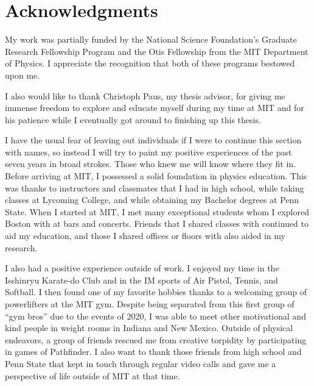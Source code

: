 % 

\cleardoublepage

\section*{Acknowledgments}

My work was partially funded by the National Science Foundation's
Graduate Research Fellowship Program and
the Otis Fellowship from the MIT Department of Physics.
I appreciate the recognition that both of these programs bestowed upon me.

I also would like to thank Christoph Paus, my thesis advisor,
for giving me immense freedom to explore and educate myself during my time at MIT and
for his patience while I eventually got around to finishing up this thesis.

I have the usual fear of leaving out individuals if I were to continue this section with names,
so instead I will try to paint my positive experiences of the past seven years in broad strokes.
Those who knew me will know where they fit in.
Before arriving at MIT, I possessed a solid foundation in physics education.
This was thanks to instructors and classmates that I had in high school,
while taking classes at Lycoming College, and while obtaining my Bachelor degrees at Penn State.
When I started at MIT,
I met many exceptional students whom I explored Boston with at bars and concerts.
Friends that I shared classes with continued to aid my education,
and those I shared offices or floors with also aided in my research.

I also had a positive experience outside of work.
I enjoyed my time in the Isshinryu Karate-do Club and
in the IM sports of Air Pistol, Tennis, and Softball.
I then found one of my favorite hobbies
thanks to a welcoming group of powerlifters at the MIT gym.
Despite being separated from this first group of ``gym bros'' due to the events of 2020,
I was able to meet other motivational and kind people in weight rooms in Indiana and New Mexico.
Outside of physical endeavors,
a group of friends rescued me from creative torpidity by participating in games of Pathfinder.
I also want to thank those friends from high school and Penn State that kept in touch
through regular video calls and gave me a perspective of life outside of MIT at that time.

